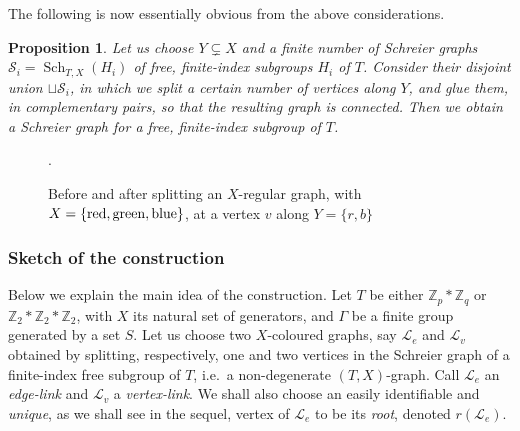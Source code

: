 \documentclass[10pt,a4paper]{amsart}
\newcommand{\ie}{i.e.\ }
\newtheorem{prop}[theo]{Proposition}
\theoremstyle{definition}
\newcommand{\ZZ}{\mathbb{Z}}
\newcommand{\cS}{\mathcal{S}}
\newcommand{\cL}{\mathcal{L}}
\DeclareMathOperator{\Sch}{Sch}
\begin{document}
The following is now essentially obvious from the above considerations. 
\begin{prop}\label{prop:splitting-gluing}
Let us choose $Y \varsubsetneq X$ and a finite number of Schreier graphs $\cS_i = \Sch_{T,X}(H_i)$ of free, finite-index subgroups $H_i$ of $T$. Consider their disjoint union ${\sqcup}\cS_i$, in which we split a certain number of vertices along $Y$, and glue them, in complementary pairs, so that the resulting graph is connected. Then we obtain a Schreier graph for a free, finite-index subgroup of $T$.
\end{prop}


 \begin{figure}[htb]
 \centering
 \qquad
 \caption{Before and after splitting an $X$-regular graph, with $X = \{\text{\textbf{r}ed}, \text{\textbf{g}reen}, \text{\textbf{b}lue}\}$, at a vertex $v$ along $Y = \{r,b\}$}.
 \label{fig:vertex-splitting}
 \end{figure}
 
\subsubsection{Sketch of the construction}
Below we explain the main idea of the construction. Let $T$ be either $\ZZ_p*\ZZ_q$ or $\ZZ_2*\ZZ_2*\ZZ_2$, with $X$ its natural set of generators, and ${\Gamma}$ be a finite group generated by a set $S$. Let us choose two $X$-coloured graphs, say $\cL_e$ and $\cL_v$ obtained by splitting, respectively, one and two vertices in the Schreier graph of a finite-index free subgroup of $T$, \ie a non-degenerate $(T,X)$-graph. Call $\cL_e$ an \emph{edge-link} and $\cL_v$ a \emph{vertex-link}. We shall also choose an easily identifiable and \emph{unique}, as we shall see in the sequel, vertex of $\cL_e$ to be its \emph{root}, denoted $r(\cL_e)$.
\end{document}
